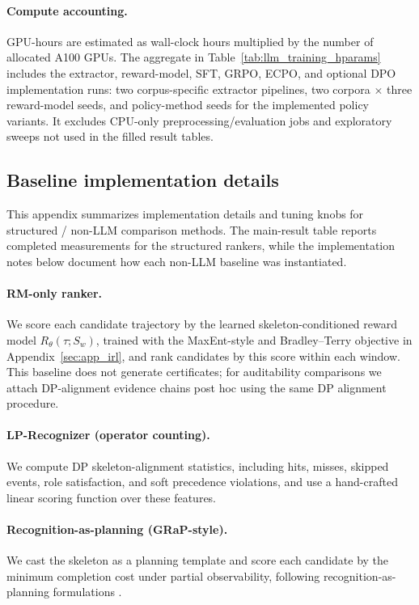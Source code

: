 \documentclass{article}
\begin{document}
\paragraph{Compute accounting.}
GPU-hours are estimated as wall-clock hours multiplied by the number of allocated A100 GPUs. The aggregate in Table~\ref{tab:llm_training_hparams} includes the extractor, reward-model, SFT, GRPO, ECPO, and optional DPO implementation runs: two corpus-specific extractor pipelines, two corpora $\times$ three reward-model seeds, and policy-method seeds for the implemented policy variants. It excludes CPU-only preprocessing/evaluation jobs and exploratory sweeps not used in the filled result tables.

\subsection{Baseline implementation details}
\label{sec:app_baselines_impl}

This appendix summarizes implementation details and tuning knobs for structured / non-LLM comparison methods. The main-result table reports completed measurements for the structured rankers, while the implementation notes below document how each non-LLM baseline was instantiated.

\paragraph{RM-only ranker.}
We score each candidate trajectory by the learned skeleton-conditioned reward model $R_\theta(\tau;S_w)$, trained with the MaxEnt-style and Bradley--Terry objective in Appendix~\ref{sec:app_irl}, and rank candidates by this score within each window.
This baseline does not generate certificates; for auditability comparisons we attach DP-alignment evidence chains post hoc using the same DP alignment procedure.

\paragraph{LP-Recognizer (operator counting).}
We compute DP skeleton-alignment statistics, including hits, misses, skipped events, role satisfaction, and soft precedence violations, and use a hand-crafted linear scoring function over these features.

\paragraph{Recognition-as-planning (GRaP-style).}
We cast the skeleton as a planning template and score each candidate by the minimum completion cost under partial observability, following recognition-as-planning formulations \citep{ramirez_plan_2009,ramirez_probabilistic_2010}.
\end{document}
